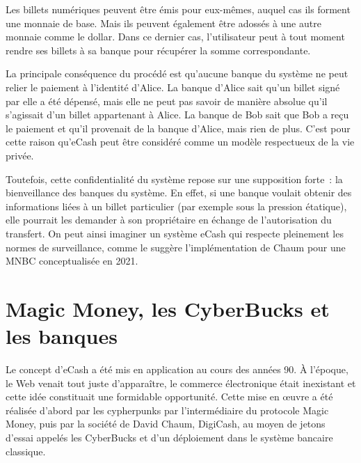 Les billets numériques peuvent être émis pour eux-mêmes, auquel cas ils forment une monnaie de base. Mais ils peuvent également être adossés à une autre monnaie comme le dollar. Dans ce dernier cas, l'utilisateur peut à tout moment rendre ses billets à sa banque pour récupérer la somme correspondante.

La principale conséquence du procédé est qu'aucune banque du système ne peut relier le paiement à l'identité d'Alice. La banque d'Alice sait qu'un billet signé par elle a été dépensé, mais elle ne peut pas savoir de manière absolue qu'il s'agissait d'un billet appartenant à Alice. La banque de Bob sait que Bob a reçu le paiement et qu'il provenait de la banque d'Alice, mais rien de plus. C'est pour cette raison qu'eCash peut être considéré comme un modèle respectueux de la vie privée.

Toutefois, cette confidentialité du système repose sur une supposition forte~: la bienveillance des banques du système. En effet, si une banque voulait obtenir des informations liées à un billet particulier (par exemple sous la pression étatique), elle pourrait les demander à son propriétaire en échange de l'autorisation du transfert. On peut ainsi imaginer un système eCash qui respecte pleinement les normes de surveillance, comme le suggère l'implémentation de Chaum pour une MNBC conceptualisée en 2021.


\section*{Magic Money, les CyberBucks et les banques} %

Le concept d'eCash a été mis en application au cours des années 90. À l'époque, le Web venait tout juste d'apparaître, le commerce électronique était inexistant et cette idée constituait une formidable opportunité. Cette mise en œuvre a été réalisée d'abord par les cypherpunks par l'intermédiaire du protocole Magic Money, puis par la société de David Chaum, DigiCash, au moyen de jetons d'essai appelés les CyberBucks et d'un déploiement dans le système bancaire classique. %

